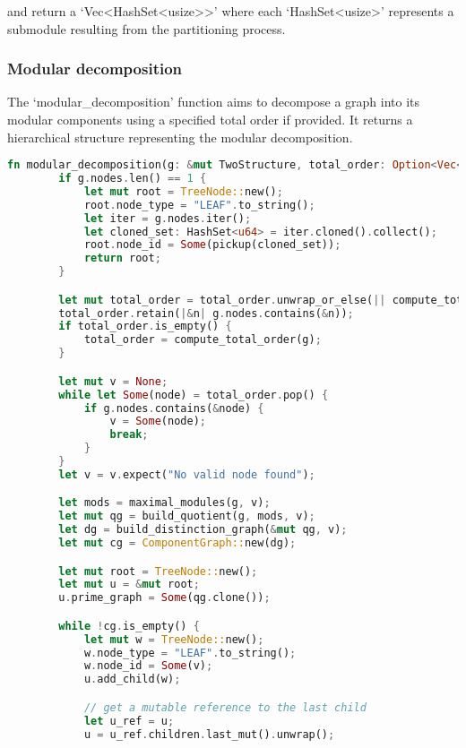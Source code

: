 and return a `Vec\textless HashSet\textless usize\textgreater\textgreater' where each `HashSet\textless usize\textgreater' represents a submodule resulting from the partitioning process.


\subsubsection{Modular decomposition}

The `modular\_decomposition' function aims to decompose a graph into its modular components using a specified total order if provided.
It returns a hierarchical structure representing the modular decomposition.

\begin{lstlisting}[language=Rust, style=rust, caption={Defining the modular decomposition}, label={lst:rust-define-modular-decomposition}, firstnumber=1]
    fn modular_decomposition(g: &mut TwoStructure, total_order: Option<Vec<u64>>) -> TreeNode {
        if g.nodes.len() == 1 {
            let mut root = TreeNode::new();
            root.node_type = "LEAF".to_string();
            let iter = g.nodes.iter();
            let cloned_set: HashSet<u64> = iter.cloned().collect();
            root.node_id = Some(pickup(cloned_set));
            return root;
        }

        let mut total_order = total_order.unwrap_or_else(|| compute_total_order(g));
        total_order.retain(|&n| g.nodes.contains(&n));
        if total_order.is_empty() {
            total_order = compute_total_order(g);
        }

        let mut v = None;
        while let Some(node) = total_order.pop() {
            if g.nodes.contains(&node) {
                v = Some(node);
                break;
            }
        }
        let v = v.expect("No valid node found");

        let mods = maximal_modules(g, v);
        let mut qg = build_quotient(g, mods, v);
        let dg = build_distinction_graph(&mut qg, v);
        let mut cg = ComponentGraph::new(dg);

        let mut root = TreeNode::new();
        let mut u = &mut root;
        u.prime_graph = Some(qg.clone());

        while !cg.is_empty() {
            let mut w = TreeNode::new();
            w.node_type = "LEAF".to_string();
            w.node_id = Some(v);
            u.add_child(w);

            // get a mutable reference to the last child
            let u_ref = u;
            u = u_ref.children.last_mut().unwrap();


\end{lstlisting}
